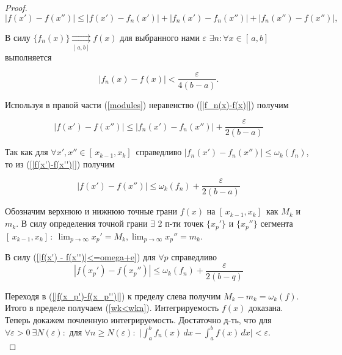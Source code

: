 \begin{proof}
\begin{equation}\label{modules}
    |f(x') - f(x'')| \le |f(x') - f_n(x')| +  |f_n(x') - f_n(x'')| +  |f_n(x'') - f(x'')|,
\end{equation}

В силу  $\{f_n(x)\} \underset{[\,a,b]\, }{\rightrightarrows}f(x)$ для выбранного нами $\varepsilon$ $\exists n: \forall x \in [\,a,b]\,$ выполняется

\begin{equation}\label{|f_n(x)-f(x)|}
    |f_n(x) - f(x)| < \frac{\varepsilon}{4(b-a)}.
\end{equation}

Используя в правой части (\ref{modules}) неравенство (\ref{|f_n(x)-f(x)|}) получим

\begin{equation}\label{|f(x')-f(x'')|}
    |f(x') - f(x'')| \le |f_n(x') - f_n(x'')| + \frac{\varepsilon}{2(b-a)}
\end{equation}

Так как для $\forall x',x'' \in [\,x_{k-1}, x_k]\,$ справедливо $|f_n(x')-f_n(x'')| \le \omega_k(f_n)$, то из (\ref{|f(x')-f(x'')|}) получим

\begin{equation}\label{|f(x') - f(x'')|<=omega+e}
    |f(x') - f(x'')| \le \omega_k(f_n) + \frac{\varepsilon}{2(b-a)}
\end{equation}

Обозначим верхнюю и нижнюю точные грани $f(x)$ на $[\,x_{k-1}, x_k]\,$ как $M_k$ и $m_k$. В силу определения точной грани $\exists$ 2 п-ти точек $\{x_p'\}$ и $\{x_p''\}$ сегмента $[\,x_{k-1}, x_k]\,: \ \lim_{p \rightarrow \infty}{x_p'} = M_k, \lim_{p \rightarrow \infty}{x_p''} = m_k$.

В силу (\ref{|f(x') - f(x'')|<=omega+e}) для $\forall p$ справедливо
\begin{equation}\label{|f(x_p')-f(x_p'')|}
    |f(x_p')-f(x_p'')| \le \omega_k(f_n) + \frac{\varepsilon}{2(b-q)}
\end{equation}

Переходя в (\ref{|f(x_p')-f(x_p'')|}) к пределу слева получим $M_k - m_k = \omega_k(f)$. Итого в пределе получаем (\ref{wk<wkn}). Интегрируемость $f(x)$ доказана. \\

Теперь докажем почленную интегрируемость. Достаточно д-ть, что для $\forall \varepsilon > 0 \ \exists N(\varepsilon):$ для $\forall n \ge N(\varepsilon):$ $\bigg|\int_{a}^{b} f_n(x) \,dx - \int_{a}^{b} f(x) \,dx\bigg| < \varepsilon$. \\


\end{proof}
